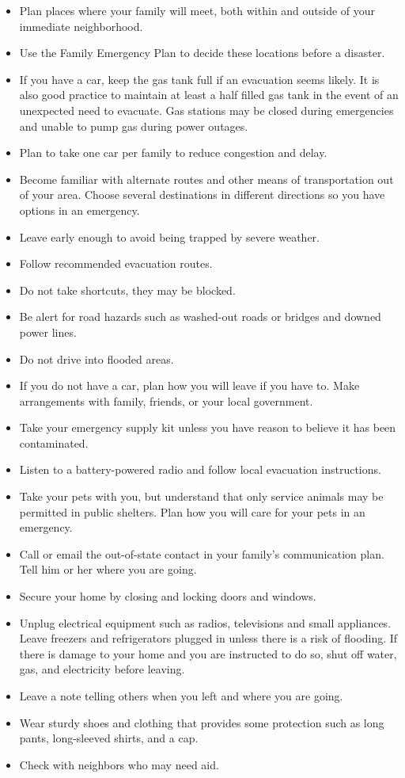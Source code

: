 \documentclass{scrreprt}
\begin{document}
\begin{itemize}
    \item Plan places where your family will meet, both within and outside of your immediate neighborhood.
    \item Use the Family Emergency Plan to decide these locations before a disaster.
\item If you have a car, keep the gas tank full if an evacuation seems likely. It is also good practice to maintain at least a half filled gas tank in the event of an unexpected need to evacuate. Gas stations may be closed during emergencies and unable to pump gas during power outages.
\item Plan to take one car per family to reduce congestion and delay.
\item Become familiar with alternate routes and other means of transportation out of your area. Choose several destinations in different directions so you have options in an emergency.
\item Leave early enough to avoid being trapped by severe weather.
\item Follow recommended evacuation routes.
\item Do not take shortcuts, they may be blocked.
\item Be alert for road hazards such as washed-out roads or bridges and downed power lines.
\item Do not drive into flooded areas.
\item If you do not have a car, plan how you will leave if you have to. Make arrangements with family, friends, or your local government.
\item Take your emergency supply kit unless you have reason to believe it has been contaminated.
\item Listen to a battery-powered radio and follow local evacuation instructions.
\item Take your pets with you, but understand that only service animals may be permitted in public shelters. Plan how you will care for your pets in an emergency.
\item Call or email the out-of-state contact in your family's communication plan. Tell him or her where you are going.
\item Secure your home by closing and locking doors and windows.
\item Unplug electrical equipment such as radios, televisions and small appliances. Leave freezers and refrigerators plugged in unless there is a risk of flooding. If there is damage to your home and you are instructed to do so, shut off water, gas, and electricity before leaving.
\item Leave a note telling others when you left and where you are going.
\item Wear sturdy shoes and clothing that provides some protection such as long pants, long-sleeved shirts, and a cap.
\item Check with neighbors who may need aid.
\end{itemize}
\end{document}
